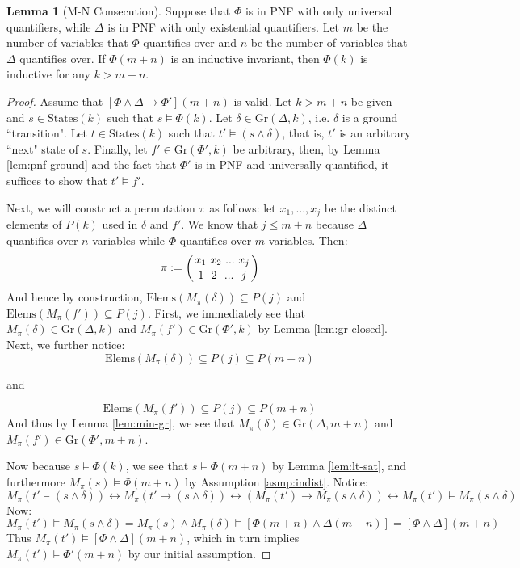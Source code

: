 \documentclass[12pt]{article}
\theoremstyle{definition}
\newtheorem{lemma}{Lemma}
\theoremstyle{remark}
\newcommand{\msp}{\text{ }}
\newcommand{\states}{\text{States}}
\newcommand{\gr}{\text{Gr}}
\newcommand{\elems}{\text{Elems}}
\newcommand{\perm}{\genfrac{}{}{0pt}{}}
\begin{document}
\begin{lemma}[M-N Consecution]
  Suppose that $\Phi$ is in PNF with only universal quantifiers, while $\Delta$ is in PNF with only existential quantifiers.  Let $m$ be the number of variables that $\Phi$ quantifies over and $n$ be the number of variables that $\Delta$ quantifies over.  If $\Phi(m+n)$ is an inductive invariant, then $\Phi(k)$ is inductive for any $k>m+n$.
\end{lemma}
\begin{proof}
  Assume that $[\Phi\land\Delta \rightarrow \Phi'](m+n)$ is valid.  Let $k>m+n$ be given and $s \in \states(k)$ such that $s \models \Phi(k)$.  Let $\delta \in \gr(\Delta,k)$, i.e. $\delta$ is a ground ``transition".  Let $t \in \states(k)$ such that $t' \models (s \land \delta)$, that is, $t'$ is an arbitrary ``next" state of $s$.  Finally, let $f' \in \gr(\Phi',k)$ be arbitrary, then, by Lemma \ref{lem:pnf-ground} and the fact that $\Phi'$ is in PNF and universally quantified, it suffices to show that $t' \models f'$.

  Next, we will construct a permutation $\pi$ as follows: let $x_1,...,x_j$ be the distinct elements of $P(k)$ used in $\delta$ and $f'$.  We know that $j \leq m+n$ because $\Delta$ quantifies over $n$ variables while $\Phi$ quantifies over $m$ variables.  Then:
  $$\pi := \left( \perm{x_1 \msp x_2 \msp ... \msp x_j}{1 \msp\msp 2 \msp\msp ... \msp\msp j} \right)$$
  And hence by construction, $\elems(M_\pi(\delta)) \subseteq P(j)$ and $\elems(M_\pi(f')) \subseteq P(j)$.  First, we immediately see that $M_\pi(\delta) \in \gr(\Delta,k)$ and $M_\pi(f') \in \gr(\Phi',k)$ by Lemma \ref{lem:gr-closed}.  Next, we further notice:
  $$\elems(M_\pi(\delta)) \subseteq P(j) \subseteq P(m+n)$$
  \begin{center}
    and
  \end{center}
  $$\elems(M_\pi(f')) \subseteq P(j) \subseteq P(m+n)$$
  And thus by Lemma \ref{lem:min-gr}, we see that $M_\pi(\delta) \in \gr(\Delta,m+n)$ and $M_\pi(f') \in \gr(\Phi',m+n)$.

  Now because $s \models \Phi(k)$, we see that $s \models \Phi(m+n)$ by Lemma \ref{lem:lt-sat}, and furthermore $M_\pi(s) \models \Phi(m+n)$ by Assumption \ref{asmp:indist}.  Notice:
  $$M_\pi(t' \models (s \land \delta)) \leftrightarrow M_\pi(t' \rightarrow (s \land \delta)) \leftrightarrow (M_\pi(t') \rightarrow M_\pi(s \land \delta)) \leftrightarrow M_\pi(t') \models M_\pi(s \land \delta)$$
  Now:
  $$M_\pi(t') \models M_\pi(s \land \delta) = M_\pi(s) \land M_\pi(\delta) \models [\Phi(m+n) \land \Delta(m+n)] = [\Phi\land\Delta](m+n)$$
  Thus $M_\pi(t') \models [\Phi\land\Delta](m+n)$, which in turn implies $M_\pi(t') \models \Phi'(m+n)$ by our initial assumption.


\end{proof}
\end{document}
